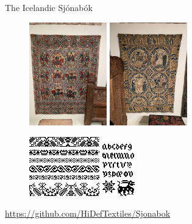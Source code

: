 \documentclass[
    NAME={Dr. Helga Ingimundardóttir},
    EMAIL={helgaingim@hi.is},
    FACULTY={Industrial Engineering},
    TITLE={HiDef Textiles: Reviving Tradition with Innovation},
    SUBTITLE={Empowering Creativity and Sustainability in Textile Production through Digital Transformation},
    SEMINAR={Reykjavík DataBeers},
    DATE={January 25, 2025},
    WIDE={true}
]{HI-LaTeX/hi-beamer}
\begin{document}
\begin{frame}[allowframebreaks]{The Icelandic Sjónabók}
\begin{figure}
\framebreak
    \includegraphics[width=0.3\textwidth]{include/riddarateppi.jpg}
    \includegraphics[width=0.3\textwidth]{include/ævijesú.jpg}
\end{figure}

\framebreak

\begin{figure}

\includegraphics[height=.65\textheight]{include/thjms2008-14_560.png}\hspace{24pt}
\includegraphics[height=.65\textheight]{include/thjms2008-14_562.png}
\end{figure}
\url{https://github.com/HiDefTextiles/Sjonabok}
\end{frame}
\end{document}
